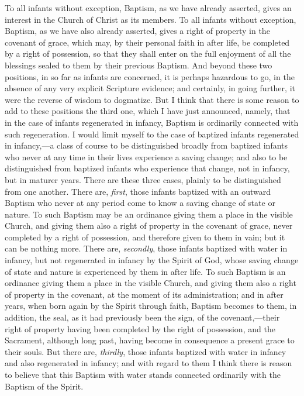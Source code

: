 \documentclass[
]{book}
\begin{document}
To all infants without exception, Baptism, as we have already asserted, gives an interest in the Church of Christ as its members. To all infants without exception, Baptism, as we have also already asserted, gives a right of property in the covenant of grace, which may, by their personal faith in after life, be completed by a right of possession, so that they shall enter on the full enjoyment of all the blessings sealed to them by their previous Baptism. And beyond these two positions, in so far as infants are concerned, it is perhaps hazardous to go, in the absence of any very explicit Scripture evidence; and certainly, in going further, it were the reverse of wisdom to dogmatize. But I think that there is some reason to add to these positions the third one, which I have just announced, namely, that in the case of infants regenerated in infancy, Baptism is ordinarily connected with such regeneration. I would limit myself to the case of baptized infants regenerated in infancy,---a class of course to be distinguished broadly from baptized infants who never at any time in their lives experience a saving change; and also to be distinguished from baptized infants who experience that change, not in infancy, but in maturer years. There are these three cases, plainly to be distinguished from one another. There are, \emph{first}, those infants baptized with an outward Baptism who never at any period come to know a saving change of state or nature. To such Baptism may be an ordinance giving them a place in the visible Church, and giving them also a right of property in the covenant of grace, never completed by a right of possession, and therefore given to them in vain; but it can be nothing more. There are, \emph{secondly}, those infants baptized with water in infancy, but not regenerated in infancy by the Spirit of God, whose saving change of state and nature is experienced by them in after life. To such Baptism is an ordinance giving them a place in the visible Church, and giving them also a right of property in the covenant, at the moment of its administration; and in after years, when born again by the Spirit through faith, Baptism becomes to them, in addition, the seal, as it had previously been the sign, of the covenant,---their right of property having been completed by the right of possession, and the Sacrament, although long past, having become in consequence a present grace to their souls. But there are, \emph{thirdly}, those infants baptized with water in infancy and also regenerated in infancy; and with regard to them I think there is reason to believe that this Baptism with water stands connected ordinarily with the Baptism of the Spirit.
\end{document}
